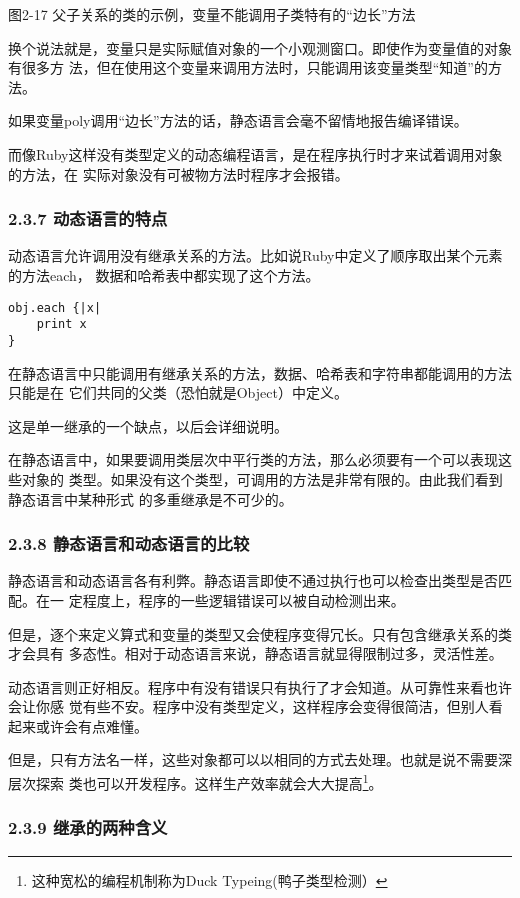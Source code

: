 \documentclass[11pt]{ctexart}
\begin{document}
图2-17 父子关系的类的示例，变量不能调用子类特有的“边长”方法

换个说法就是，变量只是实际赋值对象的一个小观测窗口。即使作为变量值的对象有很多方
法，但在使用这个变量来调用方法时，只能调用该变量类型“知道”的方法。

如果变量poly调用“边长”方法的话，静态语言会毫不留情地报告编译错误。

而像Ruby这样没有类型定义的动态编程语言，是在程序执行时才来试着调用对象的方法，在
实际对象没有可被物方法时程序才会报错。
\subsubsection{2.3.7 动态语言的特点}
\label{sec:org54c0baa}

动态语言允许调用没有继承关系的方法。比如说Ruby中定义了顺序取出某个元素的方法each，
数据和哈希表中都实现了这个方法。
\lstset{language=org,label= ,caption= ,captionpos=b,numbers=none}
\begin{lstlisting}
obj.each {|x|
    print x
}
\end{lstlisting}

在静态语言中只能调用有继承关系的方法，数据、哈希表和字符串都能调用的方法只能是在
它们共同的父类（恐怕就是Object）中定义。

这是单一继承的一个缺点，以后会详细说明。

在静态语言中，如果要调用类层次中平行类的方法，那么必须要有一个可以表现这些对象的
类型。如果没有这个类型，可调用的方法是非常有限的。由此我们看到静态语言中某种形式
的多重继承是不可少的。
\subsubsection{2.3.8 静态语言和动态语言的比较}
\label{sec:orgda55a14}

静态语言和动态语言各有利弊。静态语言即使不通过执行也可以检查出类型是否匹配。在一
定程度上，程序的一些逻辑错误可以被自动检测出来。

但是，逐个来定义算式和变量的类型又会使程序变得冗长。只有包含继承关系的类才会具有
多态性。相对于动态语言来说，静态语言就显得限制过多，灵活性差。

动态语言则正好相反。程序中有没有错误只有执行了才会知道。从可靠性来看也许会让你感
觉有些不安。程序中没有类型定义，这样程序会变得很简洁，但别人看起来或许会有点难懂。

但是，只有方法名一样，这些对象都可以以相同的方式去处理。也就是说不需要深层次探索
类也可以开发程序。这样生产效率就会大大提高\footnote{这种宽松的编程机制称为Duck Typeing(鸭子类型检测）}。
\subsubsection{2.3.9 继承的两种含义}
\label{sec:orge9d0715}
\end{document}

